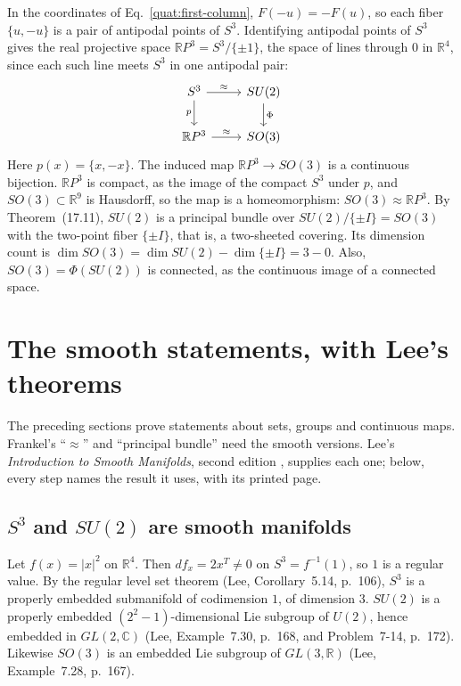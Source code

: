In the coordinates of Eq.~\eqref{quat:first-column},
$F(-u)=-F(u)$, so each fiber $\{u,-u\}$ is a pair of antipodal points of
$S^3$. Identifying antipodal points of $S^3$ gives the real projective space
$\mathbb RP^3=S^3/\{\pm1\}$, the space of lines through $0$ in $\mathbb R^4$,
since each such line meets $S^3$ in one antipodal pair:
\begin{equation}
\begin{tikzcd}
 S^3 \arrow[r,"\approx"] \arrow[d,"p"'] & SU(2) \arrow[d,"\Phi"]\\
 \mathbb RP^3 \arrow[r,"\approx"] & SO(3)
\end{tikzcd}
\end{equation}
Here $p(x)=\{x,-x\}$. The induced map $\mathbb RP^3\to SO(3)$ is a
continuous bijection. $\mathbb RP^3$ is compact, as the image of the compact
$S^3$ under $p$, and $SO(3)\subset\mathbb R^9$ is Hausdorff, so the map is a
homeomorphism: $SO(3)\approx\mathbb RP^3$. By Theorem~(17.11), $SU(2)$ is a
principal bundle over $SU(2)/\{\pm I\}=SO(3)$ with the two-point fiber
$\{\pm I\}$, that is, a two-sheeted covering. Its dimension count is
$\dim SO(3)=\dim SU(2)-\dim\{\pm I\}=3-0$. Also, $SO(3)=\Phi(SU(2))$ is
connected, as the continuous image of a connected space.

\section{The smooth statements, with Lee's theorems}\label{quat:sec:smooth-cover}
The preceding sections prove statements about sets, groups and continuous
maps. Frankel's ``$\approx$'' and ``principal bundle'' need the smooth
versions. Lee's \emph{Introduction to Smooth Manifolds}, second edition
\cite{dgdt:JLee2012}, supplies each one; below, every step names the result
it uses, with its printed page.

\subsection{\texorpdfstring{$S^3$}{S3} and \texorpdfstring{$SU(2)$}{SU(2)} are smooth manifolds}
Let $f(x)=|x|^2$ on $\mathbb R^4$. Then $df_x=2x^T\ne0$ on $S^3=f^{-1}(1)$,
so $1$ is a regular value. By the regular level set theorem
(Lee, Corollary~5.14, p.~106), $S^3$ is a properly embedded submanifold of
codimension $1$, of dimension $3$. $SU(2)$ is a properly embedded
$(2^2-1)$-dimensional Lie subgroup of $U(2)$, hence embedded in
$GL(2,\mathbb C)$ (Lee, Example~7.30, p.~168, and Problem~7-14, p.~172).
Likewise $SO(3)$ is an embedded Lie subgroup of $GL(3,\mathbb R)$ (Lee,
Example~7.28, p.~167).


